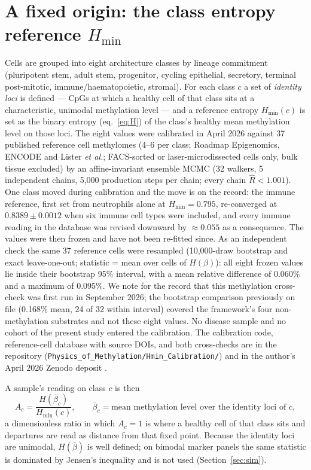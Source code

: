 \documentclass[12pt,a4paper]{article}
\begin{document}
\section{A fixed origin: the class entropy reference $H_{\min}$}
\label{sec:hmin}

Cells are grouped into eight architecture classes by lineage commitment (pluripotent stem, adult stem, progenitor, cycling epithelial, secretory, terminal post-mitotic, immune/haematopoietic, stromal). For each class $c$ a set of \emph{identity loci} is defined --- CpGs at which a healthy cell of that class sits at a characteristic, unimodal methylation level --- and a reference entropy $H_{\min}(c)$ is set as the binary entropy (eq.~\ref{eq:H}) of the class's healthy mean methylation level on those loci. The eight values were calibrated in April 2026 against 37 published reference cell methylomes (4--6 per class; Roadmap Epigenomics, ENCODE and Lister \emph{et al.}; FACS-sorted or laser-microdissected cells only, bulk tissue excluded) by an affine-invariant ensemble MCMC (32 walkers, 5 independent chains, 5,000 production steps per chain; every chain $\hat R < 1.001$). One class moved during calibration and the move is on the record: the immune reference, first set from neutrophils alone at $H_{\min} = 0.795$, re-converged at $0.8389 \pm 0.0012$ when six immune cell types were included, and every immune reading in the database was revised downward by $\approx 0.055$ as a consequence. The values were then frozen and have not been re-fitted since. As an independent check the same 37 reference cells were resampled (10,000-draw bootstrap and exact leave-one-out; statistic = mean over cells of $H(\beta)$): all eight frozen values lie inside their bootstrap 95\% interval, with a mean relative difference of 0.060\% and a maximum of 0.095\%. We note for the record that this methylation cross-check was first run in September 2026; the bootstrap comparison previously on file (0.168\% mean, 24 of 32 within interval) covered the framework's four non-methylation substrates and not these eight values. No disease sample and no cohort of the present study entered the calibration. The calibration code, reference-cell database with source DOIs, and both cross-checks are in the repository (\texttt{Physics\_of\_Methylation/Hmin\_Calibration/}) and in the author's April 2026 Zenodo deposit \citep{mahaffey2026zenodo}.

A sample's reading on class $c$ is then
\begin{equation}
A_c = \frac{H(\bar\beta_c)}{H_{\min}(c)}, \qquad \bar\beta_c = \text{mean methylation level over the identity loci of } c,
\label{eq:A}
\end{equation}
a dimensionless ratio in which $A_c = 1$ is where a healthy cell of that class sits and departures are read as distance from that fixed point. Because the identity loci are unimodal, $H(\bar\beta)$ is well defined; on bimodal marker panels the same statistic is dominated by Jensen's inequality and is not used (Section~\ref{sec:sim}).
\end{document}
